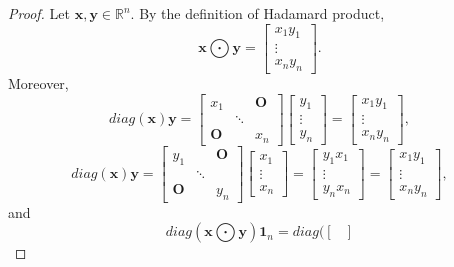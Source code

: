 \documentclass{article}
\theoremstyle{plain}
\begin{document}
\begin{proof}
	Let $\bm{x} , \bm{y} \in \mathbb{R}^n$.
	By the definition of Hadamard product,
	\begin{equation*} \bm{x} \bigodot \bm{y} = \begin{bmatrix}
			x_1 y_1 \\
			\vdots \\
			x_n y_n
		\end{bmatrix} .
	\end{equation*}
	Moreover,
	\begin{equation*}
		diag(\bm{x}) \bm{y} =
		\begin{bmatrix}
			x_1 &  & \bm{O} \\
			 & \ddots &  \\
			\bm{O} &  & x_n
		\end{bmatrix}
		\begin{bmatrix}
			y_1 \\
			\vdots \\
			y_n
		\end{bmatrix}
		=
		\begin{bmatrix}
			x_1 y_1 \\
			\vdots \\
			x_n y_n
		\end{bmatrix} ,
	\end{equation*}
	\begin{equation*}
		diag(\bm{x}) \bm{y} =
		\begin{bmatrix}
			y_1 &  & \bm{O} \\
			 & \ddots &  \\
			\bm{O} &  & y_n
		\end{bmatrix}
		\begin{bmatrix}
			x_1 \\
			\vdots \\
			x_n
		\end{bmatrix}
		=
		\begin{bmatrix}
			y_1 x_1 \\
			\vdots \\
			y_n x_n
		\end{bmatrix}
		=
		\begin{bmatrix}
			x_1 y_1 \\
			\vdots \\
			x_n y_n
		\end{bmatrix} ,
	\end{equation*}
	and
	\begin{equation*}
		diag(\bm{x} \bigodot \bm{y}) \bm{1}_n =
		diag(
		\begin{bmatrix}

\end{bmatrix}
\end{equation*}
\end{proof}
\end{document}
